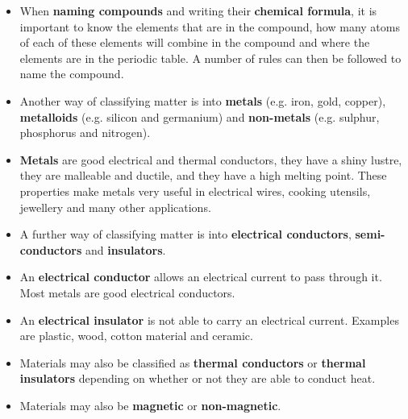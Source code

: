 \begin{itemize}[noitemsep]
\label{m38706*uid125}\item When \textbf{naming compounds} and writing their \textbf{chemical formula}, it is important to know the elements that are in the compound, how many atoms of each of these elements will combine in the compound and where the elements are in the periodic table. A number of rules can then be followed to name the compound.
\label{m38706*uid126}\item Another way of classifying matter is into \textbf{metals} (e.g. iron, gold, copper), \textbf{metalloids} (e.g. silicon and germanium) and \textbf{non-metals} (e.g. sulphur, phosphorus and nitrogen).
\label{m38706*uid127}\item \textbf{Metals} are good electrical and thermal conductors, they have a shiny lustre, they are malleable and ductile, and they have a high melting point. These properties make metals very useful in electrical wires, cooking utensils, jewellery and many other applications.
\label{m38706*uid128}\item A further way of classifying matter is into \textbf{electrical conductors}, \textbf{semi-conductors} and \textbf{insulators}.
\label{m38706*uid129}\item An \textbf{electrical conductor} allows an electrical current to pass through it. Most metals are good electrical conductors.
\label{m38706*uid130}\item An \textbf{electrical insulator} is not able to carry an electrical current. Examples are plastic, wood, cotton material and ceramic.
\label{m38706*uid131}\item Materials may also be classified as \textbf{thermal conductors} or \textbf{thermal insulators} depending on whether or not they are able to conduct heat.
\label{m38706*uid132}\item Materials may also be \textbf{magnetic} or \textbf{non-magnetic}.
\end{itemize}
\label{m38706*secfhsst!!!underscore!!!id672}
